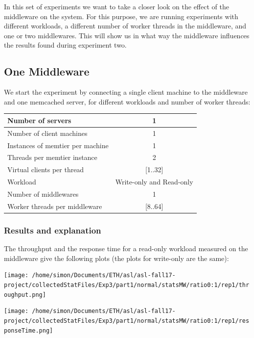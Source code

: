 \documentclass[11pt,a4paper]{article}
\begin{document}
In this set of experiments we want to take a closer look on the effect of the middleware on the system. For this purpose, we are running experiments with different workloads, a different number of worker threads in the middleware, and one or two middlewares. This will show us in what way the middleware influences the results found during experiment two. 


\subsection{One Middleware}

We start the experiment by connecting a single client machine to the middleware and one memcached server, for different workloads and number of worker threads: 

\begin{center}
	\scriptsize{
		\begin{tabular}{|l|c|}
			\hline Number of servers                & 1                        \\ 
			\hline Number of client machines        & 1                        \\ 
			\hline Instances of memtier per machine & 1                        \\ 
			\hline Threads per memtier instance     & 2                        \\
			\hline Virtual clients per thread       & [1..32]                  \\ 
			\hline Workload                         & Write-only and Read-only \\
			\hline Number of middlewares            & 1                        \\
			\hline Worker threads per middleware    & [8..64]                  \\
			\hline 
		\end{tabular}
	} 
\end{center}

\subsubsection{Results and explanation}

The throughput and the response time for a read-only workload measured on the middleware give the following plots (the plots for write-only are the same):

\begin{center}
\texttt{[image: /home/simon/Documents/ETH/asl/asl-fall17-project/collectedStatFiles/Exp3/part1/normal/statsMW/ratio0:1/rep1/throughput.png]}
\end{center}
\begin{center}
\texttt{[image: /home/simon/Documents/ETH/asl/asl-fall17-project/collectedStatFiles/Exp3/part1/normal/statsMW/ratio0:1/rep1/responseTime.png]}
\end{center}
\end{document}
